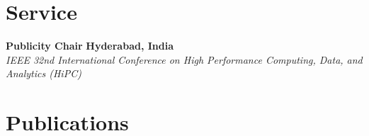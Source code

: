 \documentclass[a4paper,12pt]{article}
\begin{document}
\section{Service}
\textbf{Publicity Chair} \hfill \textbf{Hyderabad, India} \\
{\em IEEE 32nd International Conference on High Performance Computing, Data, and Analytics (HiPC)}
\section{Publications}
\nocite{*}
\printbibliography[heading=none]

\vfill
{}
\end{document}

